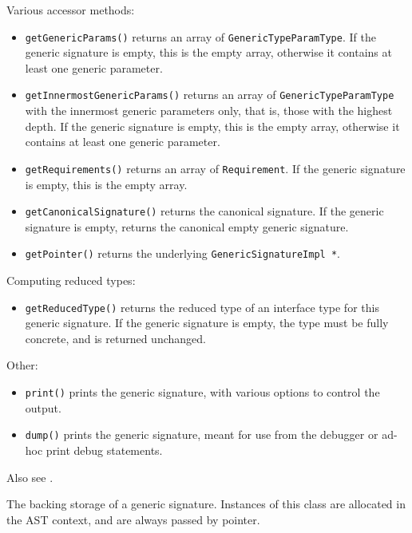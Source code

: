 \documentclass[../generics]{subfiles}
\begin{document}
Various accessor methods:
\begin{itemize}
\item \texttt{getGenericParams()} returns an array of \texttt{GenericTypeParamType}. If the generic signature is empty, this is the empty array, otherwise it contains at least one generic parameter.
\item \texttt{getInnermostGenericParams()} returns an array of \texttt{GenericTypeParamType} with the innermost generic parameters only, that is, those with the highest depth. If the generic signature is empty, this is the empty array, otherwise it contains at least one generic parameter.
\item \texttt{getRequirements()} returns an array of \texttt{Requirement}. If the generic signature is empty, this is the empty array.
\item \texttt{getCanonicalSignature()} returns the canonical signature. If the generic signature is empty, returns the canonical empty generic signature.
\item \texttt{getPointer()} returns the underlying \texttt{GenericSignatureImpl *}.
\end{itemize}
Computing reduced types:
\begin{itemize}
\item \texttt{getReducedType()} returns the reduced type of an interface type for this generic signature. If the generic signature is empty, the type must be fully concrete, and is returned unchanged.
\end{itemize}
Other:
\begin{itemize}
\item \texttt{print()} prints the generic signature, with various options to control the output.
\item \texttt{dump()} prints the generic signature, meant for use from the debugger or ad-hoc print debug statements.
\end{itemize}
Also see .

The backing storage of a generic signature. Instances of this class are allocated in the AST context, and are always passed by pointer.
\end{document}
